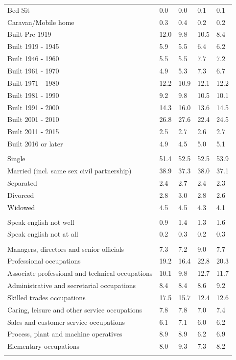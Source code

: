 \documentclass{article}
\begin{document}
\begin{table}[h]
\begin{tabular}{KTTTT}
Bed-Sit & 0.0& 0.0& 0.1& 0.1\\
Caravan/Mobile home & 0.3& 0.4& 0.2& 0.2\\
    \hline
Built Pre 1919 & 12.0&  9.8& 10.5&  8.4\\
Built 1919 - 1945 & 5.9& 5.5& 6.4& 6.2\\
Built  1946 - 1960 & 5.5& 5.5& 7.7& 7.2\\
Built  1961 - 1970 & 4.9& 5.3& 7.3& 6.7\\
Built  1971 - 1980 & 12.2& 10.9& 12.1& 12.2\\
Built  1981 - 1990 &  9.2&  9.8& 10.5& 10.1\\
Built  1991 - 2000 & 14.3& 16.0& 13.6& 14.5\\
Built  2001 - 2010 & 26.8& 27.6& 22.4& 24.5\\
Built  2011 - 2015 & 2.5& 2.7& 2.6& 2.7\\
Built  2016 or later & 4.9& 4.5& 5.0& 5.1\\
\hline
    \\
    \hline
Single & 51.4& 52.5& 52.5& 53.9\\
Married (incl. same sex civil partnership) & 38.9& 37.3& 38.0& 37.1\\
Separated  & 2.4& 2.7& 2.4& 2.3\\
Divorced  & 2.8& 3.0& 2.8& 2.6\\
Widowed & 4.5& 4.5& 4.3& 4.1\\
\hline
    \\ 
    \hline
Speak english not well & 0.9& 1.4& 1.3& 1.6\\
Speak english not at all & 0.2& 0.3& 0.2& 0.3\\
\hline
    \\
    \hline
Managers, directors and senior officials & 7.3& 7.2& 9.0& 7.7\\
Professional occupations & 19.2& 16.4& 22.8& 20.3\\
Associate professional and technical occupations & 10.1&  9.8& 12.7& 11.7\\
Administrative and secretarial occupations & 8.4& 8.4& 8.6& 9.2\\
Skilled trades occupations & 17.5& 15.7& 12.4& 12.6\\
Caring, leisure and other service occupations & 7.8& 7.8& 7.0& 7.4\\
Sales and customer service occupations & 6.1& 7.1& 6.0& 6.2\\
Process, plant and machine operatives & 8.9& 8.9& 6.2& 6.9\\
Elementary occupations & 8.0& 9.3& 7.3& 8.2\\
\hline
\end{tabular}
\end{table}
\end{document}
